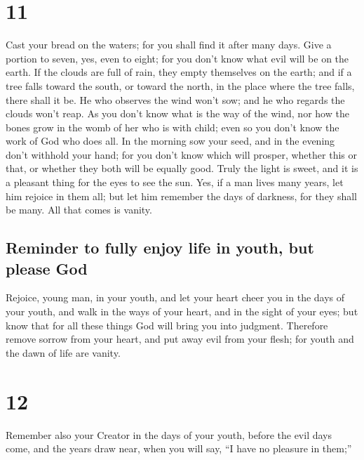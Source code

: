 \hypertarget{section-10}{%
\section{11}\label{section-10}}

 Cast your bread on the waters; for you shall find it
after many days.  Give a portion to seven, yes, even to
eight; for you don't know what evil will be on the earth. 
If the clouds are full of rain, they empty themselves on the earth; and
if a tree falls toward the south, or toward the north, in the place
where the tree falls, there shall it be.  He who observes
the wind won't sow; and he who regards the clouds won't reap.
 As you don't know what is the way of the wind, nor how
the bones grow in the womb of her who is with child; even so you don't
know the work of God who does all.  In the morning sow
your seed, and in the evening don't withhold your hand; for you don't
know which will prosper, whether this or that, or whether they both will
be equally good.  Truly the light is sweet, and it is a
pleasant thing for the eyes to see the sun.  Yes, if a man
lives many years, let him rejoice in them all; but let him remember the
days of darkness, for they shall be many. All that comes is vanity.

\hypertarget{reminder-to-fully-enjoy-life-in-youth-but-please-god}{%
\subsection{Reminder to fully enjoy life in youth, but please
God}\label{reminder-to-fully-enjoy-life-in-youth-but-please-god}}

 Rejoice, young man, in your youth, and let your heart
cheer you in the days of your youth, and walk in the ways of your heart,
and in the sight of your eyes; but know that for all these things God
will bring you into judgment.  Therefore remove sorrow
from your heart, and put away evil from your flesh; for youth and the
dawn of life are vanity.

\hypertarget{section-11}{%
\section{12}\label{section-11}}

 Remember also your Creator in the days of your youth,
before the evil days come, and the years draw near, when you will say,
``I have no pleasure in them;''

